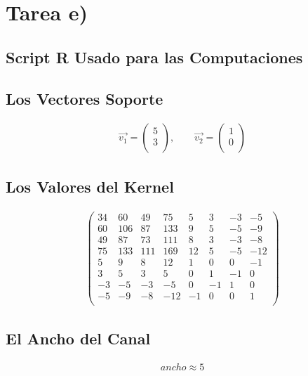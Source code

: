\documentclass[fleqn]{llncs}
\begin{document}
\newpage

\section{Tarea e)}

\subsection{Script R Usado para las Computaciones}


\newpage

\subsection{Los Vectores Soporte}
\begin{align*}
	\overrightarrow{v_1} =
	\begin{pmatrix}
		5 \\
		3 \\
	\end{pmatrix},
	\qquad
	\overrightarrow{v_2} =
	\begin{pmatrix}
		1 \\
		0 \\
	\end{pmatrix}
\end{align*}

\subsection{Los Valores del Kernel}
\begin{align*}
	\begin{pmatrix}
		34 & 60 & 49 & 75 &  5 &  3 & -3 & -5 \\
		60 & 106 & 87 & 133 &  9 &  5 & -5 & -9 \\
		49 & 87 & 73 & 111 &  8 &  3 & -3 & -8 \\
		75 & 133 & 111 & 169 & 12 &  5 & -5 & -12 \\
		5 & 9 & 8 & 12 &  1 &  0 &  0 & -1 \\
		3 & 5 & 3 & 5 &  0 &  1 & -1 &  0 \\
		-3 & -5 & -3 & -5 &  0 & -1 &  1 &  0 \\
		-5 & -9 & -8 & -12 & -1 &  0 &  0 &  1 \\
	\end{pmatrix}
\end{align*}

\subsection{El Ancho del Canal}
\begin{align*}
	ancho \approx 5
\end{align*}
\end{document}
